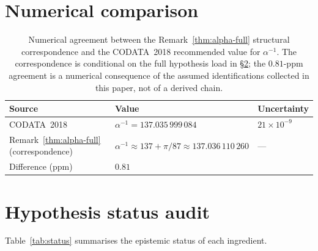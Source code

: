 \documentclass[12pt]{article}
\theoremstyle{definition}
\theoremstyle{remark}
\begin{document}
\section{Numerical comparison}\label{sec:numerical}

\begin{table}[h]
\centering
\begin{tabular}{lll}
\toprule
Source & Value & Uncertainty \\
\midrule
CODATA~2018~\citep{CODATA2018} & $\alpha^{-1} = 137.035\,999\,084$ & $21 \times 10^{-9}$ \\
Remark~\ref{thm:alpha-full} (correspondence) & $\alpha^{-1} \approx 137 + \pi/87 \approx 137.036\,110\,260$ & --- \\
\midrule
Difference (ppm) & \multicolumn{2}{l}{$0.81$} \\
\bottomrule
\end{tabular}
\caption{Numerical agreement between the Remark~\ref{thm:alpha-full} structural correspondence and the CODATA~2018 recommended value for $\alpha^{-1}$. The correspondence is conditional on the full hypothesis load in \S\ref{sec:status}; the $0.81$-ppm agreement is a numerical consequence of the assumed identifications collected in this paper, not of a derived chain.}
\label{tab:numerical}
\end{table}

\section{Hypothesis status audit}\label{sec:status}

Table~\ref{tab:status} summarises the epistemic status of each ingredient.
\end{document}

